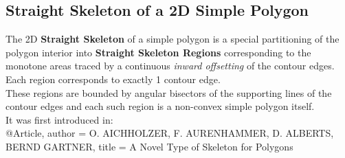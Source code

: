 \subsection{Straight Skeleton of a 2D Simple Polygon}
 
The 2D \textbf{Straight Skeleton} of a simple polygon is a special partitioning of the polygon interior into \textbf{Straight Skeleton Regions} corresponding to the monotone areas traced by a continuous \textit{inward offsetting} of the contour edges. Each region corresponds to exactly 1 contour edge.\\
These regions are bounded by angular bisectors of the supporting lines of the contour edges and each such region is a non-convex simple polygon itself.\\
It was first introduced in:\\

@Article{,
author = {O. AICHHOLZER, F. AURENHAMMER, D. ALBERTS, BERND GARTNER},
title = {A Novel Type of Skeleton for Polygons}
}

